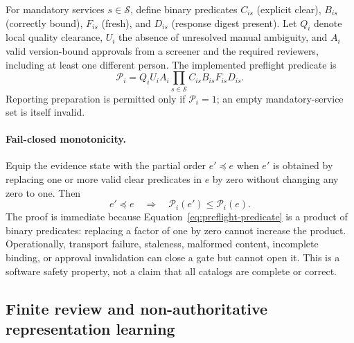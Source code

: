 \documentclass[11pt]{article}
\begin{document}
For mandatory services $s\in\mathcal{S}$, define binary predicates $C_{is}$ (explicit clear), $B_{is}$ (correctly bound), $F_{is}$ (fresh), and $D_{is}$ (response digest present). Let $Q_i$ denote local quality clearance, $U_i$ the absence of unresolved manual ambiguity, and $A_i$ valid version-bound approvals from a screener and the required reviewers, including at least one different person. The implemented preflight predicate is
\begin{equation}
  \mathcal{P}_i
  =Q_iU_iA_i\prod_{s\in\mathcal{S}}C_{is}B_{is}F_{is}D_{is}.
\label{eq:preflight-predicate}
\end{equation}
Reporting preparation is permitted only if $\mathcal{P}_i=1$; an empty mandatory-service set is itself invalid.

\paragraph{Fail-closed monotonicity.}
Equip the evidence state with the partial order $e'\preceq e$ when $e'$ is obtained by replacing one or more valid clear predicates in $e$ by zero without changing any zero to one. Then
\begin{equation}
  e'\preceq e \quad\Longrightarrow\quad
  \mathcal{P}_i(e')\leq\mathcal{P}_i(e).
\label{eq:monotonicity}
\end{equation}
The proof is immediate because Equation~\ref{eq:preflight-predicate} is a product of binary predicates: replacing a factor of one by zero cannot increase the product. Operationally, transport failure, staleness, malformed content, incomplete binding, or approval invalidation can close a gate but cannot open it. This is a software safety property, not a claim that all catalogs are complete or correct.

\subsection{Finite review and non-authoritative representation learning}
\end{document}
